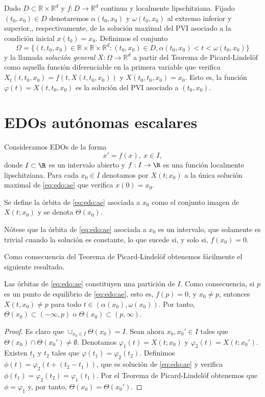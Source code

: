 \documentclass{article}
\begin{document}
Dado $D \subset \mathbb{R} \times \mathbb{R}^d$ y $f : D \to \mathbb{R}^d$ continua y localmente lipschitziana. Fijado $(t_0, x_0) \in D$ denotaremos $\alpha(t_0, x_0)$ y $\omega(t_0, x_0)$ al extremo inferior y superior,, respectivamente, de la solución maximal del PVI asociado a la condición inicial $x(t_0) = x_0$. Definimos el conjunto
\[\Omega = \{(t, t_0, x_0) \in \mathbb{R}\times\mathbb{R}\times\mathbb{R}^d : (t_0, x_0) \in D, \alpha(t_0, x_0) < t < \omega(t_0, x_0)\}\]
y la llamada \emph{solución general} $X: \Omega \to \mathbb{R}^d$ a partir del Teorema de Picard-Lindelöf como aquella función diferenciable en la primera variable que verifica $X_t(t, t_0, x_0) = f(t, X(t, t_0, x_0))$ y $X(t_0, t_0, x_0) = x_0$. Esto es, la función $\varphi(t) = X(t, t_0, x_0)$ es la solución del PVI asociado a $(t_0, x_0)$.

\section{EDOs autónomas escalares}

Consideramos EDOs de la forma
\begin{equation}
  \label{eq:edo:ae}
  x' = f(x), \ x \in I,
\end{equation}
donde $I \subset \R$ es un intervalo abierto y $f : I \to \R$ es una función localmente
lipschitziana. Para cada $x_0 \in I$ denotamos por $X(t; x_0)$ a la única solución maximal de
\eqref{eq:edo:ae} que verifica $x(0) = x_0$.

\begin{definition}
  Se define la órbita de \eqref{eq:edo:ae} asociada a $x_0$ como el conjunto imagen de $X(t; x_0)$ y
  se denota $\Theta(x_0)$.
\end{definition}

Nótese que la órbita de \eqref{eq:edo:ae} asociada a $x_0$ es un intervalo, que solamente es trivial
cuando la solución es constante, lo que sucede si, y solo si, $f(x_0) = 0$.

Como consecuencia del Teorema de Picard-Lindelöf obtenemos fácilmente el siguiente resultado.

\begin{prop}
  Las órbitas de \eqref{eq:edo:ae} constituyen una partición de $I$. Como consecuencia, si $p$ es un
  punto de equilibrio de \eqref{eq:edo:ae}, esto es, $f(p) = 0$, y $x_0 \ne p$, entonces
  $X(t, x_0) \ne p$ para todo $t \in (\alpha(x_0), \omega(x_0))$. Por tanto,
  $\Theta(x_0) \subset (-\infty, p)$ o $\Theta(x_0) \subset (p, \infty)$.
\end{prop}
\begin{proof}
  Es claro que $\cup_{x_0 \in I} \Theta(x_0) = I$. Sean ahora $x_0, x_0' \in I$ tales que
  $\Theta(x_0) \cap \Theta(x_0') \ne \emptyset$. Denotamos $\varphi_1(t) = X(t; x_0)$ y
  $\varphi_2(t) = X(t; x_0')$. Existen $t_1$ y $t_2$ tales que $\varphi(t_1) =
  \varphi_2(t_2)$. Definimos $\phi(t) = \varphi_2(t + (t_2 - t_1))$, que es solución de \eqref{eq:edo:ae} y verifica $\phi(t_1) = \varphi_2(t_2) = \varphi_1(t_1)$. Por el Teorema de Picard-Lindelöf obtenemos que $\phi = \varphi_1$ y, por tanto, $\Theta(x_0) = \Theta(x_0')$.
\end{proof}
\end{document}
